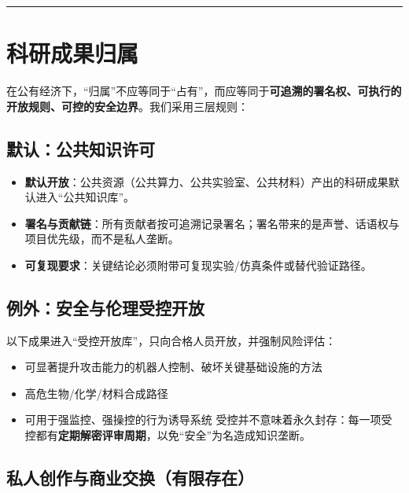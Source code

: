 \begin{center}\rule{0.5\linewidth}{0.5pt}\end{center}

\section{科研成果归属}\label{ux79d1ux7814ux6210ux679cux5f52ux5c5e}

在公有经济下，``归属''不应等同于``占有''，而应等同于\textbf{可追溯的署名权、可执行的开放规则、可控的安全边界}。我们采用三层规则：

\subsection{默认：公共知识许可}\label{ux9ed8ux8ba4ux516cux5171ux77e5ux8bc6ux8bb8ux53ef}

\begin{itemize}
\item
  \textbf{默认开放}：公共资源（公共算力、公共实验室、公共材料）产出的科研成果默认进入``公共知识库''。
\item
  \textbf{署名与贡献链}：所有贡献者按可追溯记录署名；署名带来的是声誉、话语权与项目优先级，而不是私人垄断。
\item
  \textbf{可复现要求}：关键结论必须附带可复现实验/仿真条件或替代验证路径。
\end{itemize}

\subsection{例外：安全与伦理受控开放}\label{ux4f8bux5916ux5b89ux5168ux4e0eux4f26ux7406ux53d7ux63a7ux5f00ux653e}

以下成果进入``受控开放库''，只向合格人员开放，并强制风险评估：

\begin{itemize}
\item
  可显著提升攻击能力的机器人控制、破坏关键基础设施的方法
\item
  高危生物/化学/材料合成路径
\item
  可用于强监控、强操控的行为诱导系统
  受控并不意味着永久封存：每一项受控都有\textbf{定期解密评审周期}，以免``安全''为名造成知识垄断。
\end{itemize}

\subsection{私人创作与商业交换（有限存在）}\label{ux79c1ux4ebaux521bux4f5cux4e0eux5546ux4e1aux4ea4ux6362ux6709ux9650ux5b58ux5728}

